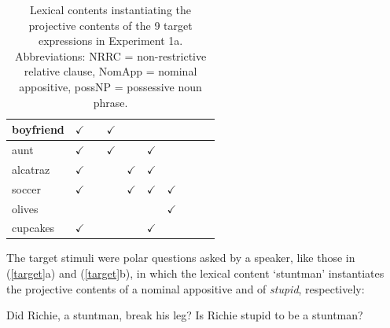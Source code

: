 \documentclass[11pt,fleqn]{article}
\newcommand{\6}{\mbox{$[\hspace*{-.6mm}[$}}
\newcommand{\9}{\mbox{$]\hspace*{-.6mm}]$}}
\begin{document}
\begin{table}[!h]
\begin{center}
\begin{tabular}{l|ccccccccc}
boyfriend & $\checkmark$ & & $\checkmark$ & & & & & &  \\

\hline

aunt & $\checkmark$ & & $\checkmark$ & & $\checkmark$ & & & &  \\

\hline

alcatraz & $\checkmark$ & & & $\checkmark$ & $\checkmark$ & & & &  \\

\hline

soccer & $\checkmark$ & & & $\checkmark$ & $\checkmark$ & $\checkmark$ & & &  \\

\hline

olives & & & & & & $\checkmark$ & & &  \\

\hline

cupcakes & $\checkmark$ & & & & $\checkmark$ & & & &  \\

\hline

\end{tabular}
\end{center}
\caption{Lexical contents instantiating the projective contents of the 9 target expressions in Experiment 1a. Abbreviations: NRRC = non-restrictive relative clause, NomApp = nominal appositive, possNP = possessive noun phrase.}\label{t-trigger-content-pairs}
\end{table}

\newpage

The target stimuli were polar questions asked by a speaker, like those in (\ref{target}a) and (\ref{target}b), in which the lexical content `stuntman' instantiates the projective contents of a nominal appositive and of {\em stupid}, respectively:

\begin{exe}
\ex\label{target}
\begin{xlist}
\ex Did Richie, a stuntman, break his leg?
\ex Is Richie stupid to be a stuntman?
\end{xlist}
\end{exe}
\end{document}
